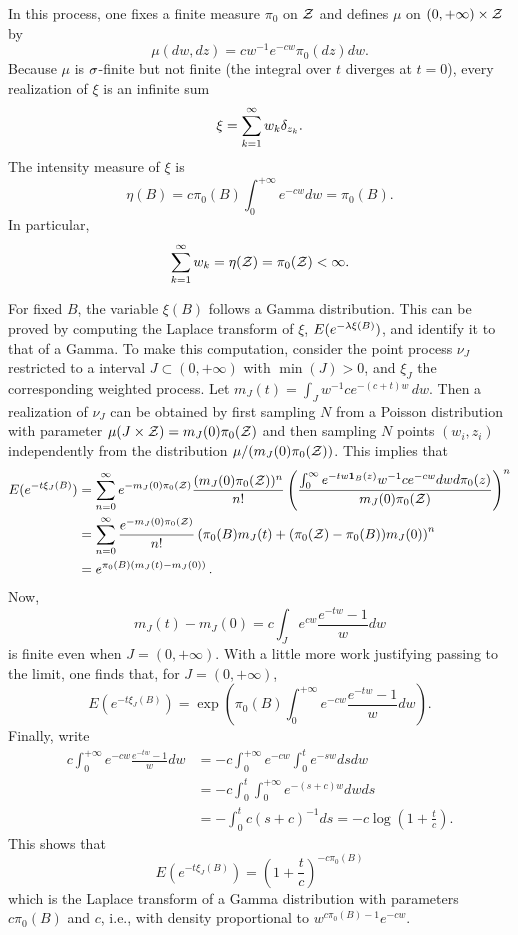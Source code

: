 In this process, one fixes a finite measure $\pi_0$ on ${\mathcal Z}$ and defines  $\mu$ on $(0, +\infty) \times {\mathcal Z}$ by
\[
\mu(dw, dz) = cw^{-1} e^{-cw} \pi_0(dz) dw.
\]
Because $\mu$ is $\sigma$-finite but not finite (the integral over $t$ diverges at $t=0$), every realization of $\xi$ is an infinite sum
\[
\xi = \sum_{k=1}^\infty w_k \delta_{z_k}.
\]
The intensity measure of $\xi$ is 
\[
\eta(B) = c \pi_0(B) \int_0^{+\infty} e^{-cw}dw = \pi_0(B).
\]
In particular, 
\[
\sum_{k=1}^\infty w_k = \eta({\mathcal Z}) = \pi_0({\mathcal Z}) < \infty.
\]

For fixed $B$, the variable $\xi(B)$ follows a Gamma distribution. This can be proved by computing the Laplace transform of $\xi$,
$E(e^{-\lambda \xi(B)})$, and identify it to that of a Gamma. To make this computation, consider the point process $\nu_J$ restricted to a interval $J\subset (0, +\infty)$ with $\min(J)>0$, and $\xi_J$ the corresponding weighted process. Let $m_J(t) = \int_J w^{-1} ce^{-(c+t)w}\, dw$. Then a realization of $\nu_J$ can be obtained by first sampling $N$ from a Poisson distribution with parameter $\mu(J\times {\mathcal Z})= m_J(0) \pi_0({\mathcal Z})$ and then sampling $N$ points $(w_i, z_i)$ independently from the distribution $\mu/(m_J(0)\pi_0({\mathcal Z}))$. This implies that
\begin{align*}
E(e^{-t\xi_J(B)}) &= \sum_{n=0}^\infty e^{-m_J(0) \pi_0({\mathcal Z})} \frac{(m_J(0) \pi_0({\mathcal Z}))^n}{n!} \left(\frac{\int_0^\infty e^{-tw{\bm 1}_B(z)} w^{-1} ce^{-cw} dw d\pi_0(z)}{m_J(0)\pi_0({\mathcal Z})}\right)^n\\
&= \sum_{n=0}^\infty \frac{e^{-m_J(0) \pi_0({\mathcal Z})}}{n!} \left(\pi_0(B) m_J(t) + (\pi_0({\mathcal Z}) -\pi_0(B))m_J(0)\right)^n\\
&= e^{\pi_0(B) (m_J(t) - m_J(0))}\,.
\end{align*}
Now, 
\[
m_J(t) - m_J(0) = c\int_J e^{cw} \frac{e^{-tw}-1}{w} dw
\]
is finite even when $J= (0, +\infty)$. With a little more work justifying passing to the limit, one finds that, for $J= (0, +\infty)$,
\[
E(e^{-t\xi_J(B)}) = \exp\left(\pi_0(B) \int_0^{+\infty} e^{-cw} \frac{e^{-tw}-1}{w} dw\right).
\]
Finally, write
\begin{align*}
c\int_0^{+\infty} e^{-cw} \frac{e^{-tw}-1}{w} dw &= -c\int_0^{+\infty} e^{-cw} \int_0^t e^{-sw} ds dw \\
&= -c\int_0^{t} \int_{0}^{+\infty} e^{-(s+c)w} dw ds\\
&= -\int_0^{t} c(s+c)^{-1} ds = -c\log(1+\frac{t}{c}).
\end{align*}
This shows that 
\[
E(e^{-t\xi_J(B)}) = \left(1+\frac{t}{c}\right)^{-c\pi_0(B)}
\]
which is the Laplace transform of a Gamma distribution with parameters $c\pi_0(B)$ and $c$, i.e., with density proportional to $w^{c\pi_0(B)-1} e^{-cw}$.
\bigskip

